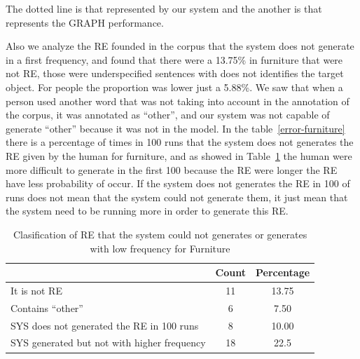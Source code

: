 The dotted line is that represented by our system and the another is that represents the GRAPH performance.

Also we analyze the RE founded in the corpus that the system does not generate in a first frequency, and found that there were a 13.75\% in furniture that were not RE, those were underspecified sentences with does not identifies the target object. For people the proportion was lower just a 5.88\%. We saw that when a person used another word that was not taking into account in the annotation of the corpus, it was annotated as ``other'', and our system was not capable of generate ``other'' because it was not in the model.
In the table~\ref{error-furniture} there is a percentage of times in 100 runs that the system does not generates the RE given by the human for furniture, and as showed in Table~\ref{error-people} the human were more difficult to generate in the first 100 because the RE were longer the RE have less probability of occur. If the system does not generates the RE in 100 of runs does not mean that the system could not generate them, it just mean that the system need to be running more in order to generate this RE.\\


\begin{table}[h!]
\begin{center}
\begin{tabular}{|l|c|c|}
\hline
		& Count		& Percentage\\
\hline
It is not RE	&	11	&	13.75 \\
Contains ``other''	&	6	&	7.50 \\
\hline
SYS does not generated the RE in 100 runs	&	8	&	10.00 \\
SYS generated but not with higher frequency	&	18	&	22.5 \\
\hline
\end{tabular}
\caption{Clasification of RE that the system could not generates or generates with low frequency for Furniture}
\label{error-people}
\end{center}
\end{table}

